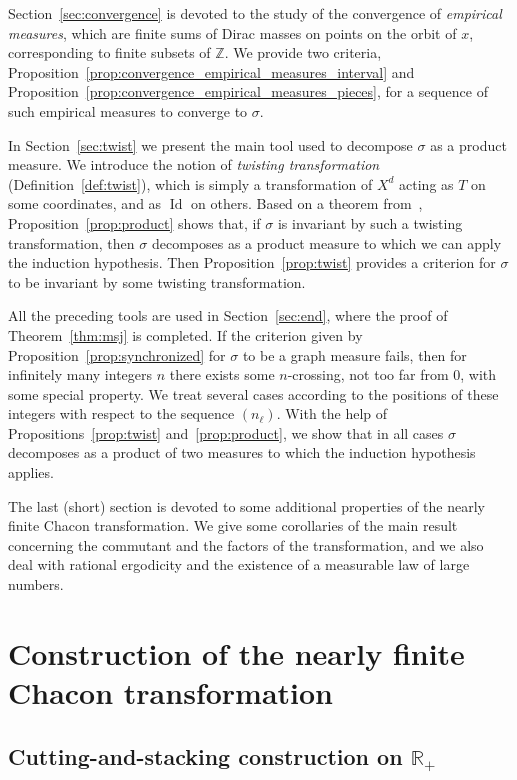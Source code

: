 \documentclass[10pt]{amsart}
\theoremstyle{definition}\newtheorem{defi}[theo]{Definition}\newtheorem{rema}[theo]{Remark}\newtheorem{exam}[theo]{Example}\newtheorem{exem}[theo]{Example}\newtheorem{nota}[theo]{Notation}
\DeclareMathOperator{\Id}{Id}
\newcommand{\ZZ}{\mathbb{Z}}
\newcommand{\RR}{\mathbb{R}}
\begin{document}
Section~\ref{sec:convergence} is devoted to the study of the convergence of \emph{empirical measures}, which are finite sums of Dirac masses on points on the orbit of $x$, corresponding to finite subsets of $\ZZ$. We provide two criteria, Proposition~\ref{prop:convergence_empirical_measures_interval} and Proposition~\ref{prop:convergence_empirical_measures_pieces}, for a sequence of such empirical measures to converge to $\sigma$.

In Section~\ref{sec:twist} we present the main tool used to decompose $\sigma$ as a product measure. We introduce the notion of \emph{twisting transformation} (Definition~\ref{def:twist}), which is simply a transformation of $X^d$ acting as $T$ on some coordinates, and as $\Id$ on others. Based on a theorem from~\cite{ChaconInfinite}, Proposition~\ref{prop:product} shows that, if $\sigma$ is invariant by such a twisting transformation, then $\sigma$ decomposes as a product measure to which we can apply the induction hypothesis. Then Proposition~\ref{prop:twist} provides a criterion for $\sigma$ to be invariant by some twisting transformation.

All the preceding tools are used in Section~\ref{sec:end}, where the proof of Theorem~\ref{thm:msj} is completed. If the criterion given by Proposition~\ref{prop:synchronized} for $\sigma$ to be a graph measure fails, then for infinitely many integers $n$ there exists some $n$-crossing, not too far from 0, with some special property. We treat several cases according to the positions of these integers with respect to the sequence $(n_\ell)$. With the help of Propositions~\ref{prop:twist} and~\ref{prop:product}, we show that in all cases $\sigma$ decomposes as a product of two measures to which the induction hypothesis applies.

The last (short) section is devoted to some additional properties of the nearly finite Chacon transformation. We give some corollaries of the main result concerning the commutant and the factors of the transformation, and we also deal with rational ergodicity and the existence of a measurable law of large numbers.


\section{Construction of the nearly finite Chacon transformation}\label{sec:construction}

\subsection{Cutting-and-stacking construction on \texorpdfstring{$\RR_+$}{R+}}\label{sec:cutandstack}
\end{document}
